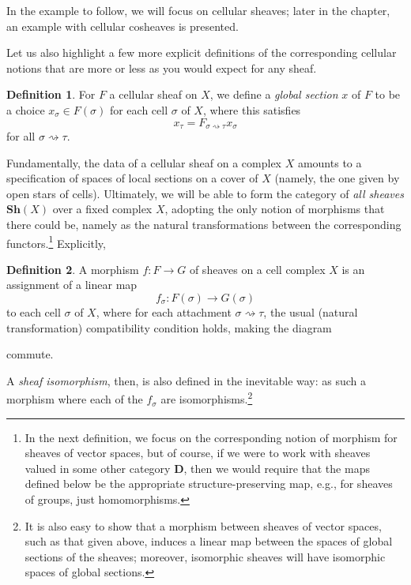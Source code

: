 \documentclass[11pt]{book}
\theoremstyle{definition}
\theoremstyle{definition}
\newtheorem{definition}{Definition}[section]
\theoremstyle{definition}
\theoremstyle{theorem}
\theoremstyle{definition}
\begin{document}
In the example to follow, we will focus on cellular sheaves; later in the chapter, an example with cellular cosheaves is presented. \par 
Let us also highlight a few more explicit definitions of the corresponding cellular notions that are more or less as you would expect for any sheaf.   
	\begin{definition}
		For $F$ a cellular sheaf on $X$, we define a \textit{global section} $x$ of $F$ to be a choice $x_{\sigma} \in F(\sigma)$ for each cell $\sigma$ of $X$, where this satisfies 
		\begin{equation*}
		x_{\tau} = F_{\sigma \rightsquigarrow \tau} x_{\sigma} 
		\end{equation*}
		for all $\sigma \rightsquigarrow \tau$. 
	\end{definition} \noindent 
Fundamentally, the data of a cellular sheaf on a complex $X$ amounts to a specification of spaces of local sections on a cover of $X$ (namely, the one given by open stars of cells). 
Ultimately, we will be able to form the category of \textit{all sheaves} $\textbf{Sh}(X)$ over a fixed complex $X$, adopting the only notion of morphisms that there could be, namely as the natural transformations between the corresponding functors.\footnote{In the next definition, we focus on the corresponding notion of morphism for sheaves of vector spaces, but of course, if we were to work with sheaves valued in some other category $\textbf{D}$, then we would require that the maps defined below be the appropriate structure-preserving map, e.g., for sheaves of groups, just homomorphisms.} Explicitly, 
\begin{definition}
	A morphism $f: F \rightarrow G$ of sheaves on a cell complex $X$ is an assignment of a linear map 
	\begin{equation*}
	f_{\sigma}: F(\sigma) \rightarrow G(\sigma)
	\end{equation*}
	to each cell $\sigma$ of $X$, where for each attachment $\sigma \rightsquigarrow \tau$, the usual (natural transformation) compatibility condition holds, making the diagram 
	\begin{center}
	\end{center} \par \noindent 
	commute. \par 
	A \textit{sheaf isomorphism}, then, is also defined in the inevitable way: as such a morphism where each of the $f_{\sigma}$ are isomorphisms.\footnote{It is also easy to show that a morphism between sheaves of vector spaces, such as that given above, induces a linear map between the spaces of global sections of the sheaves; moreover, isomorphic sheaves will have isomorphic spaces of global sections.} 
\end{definition} 
\end{document}
